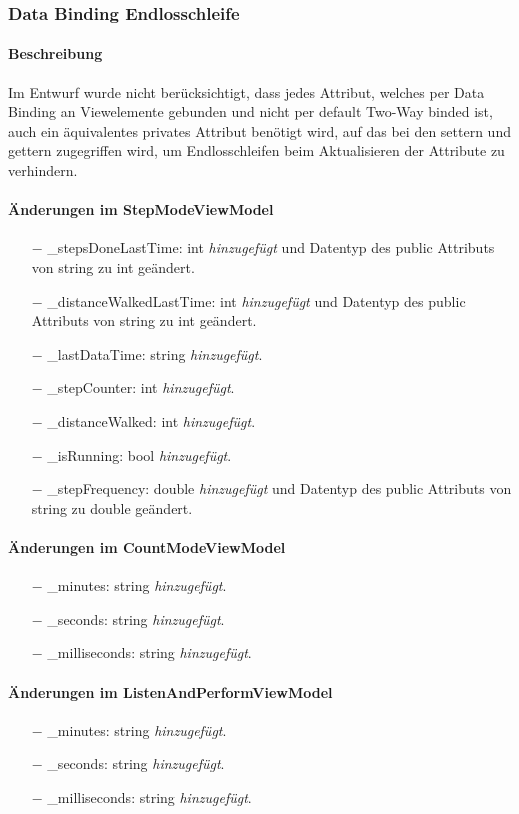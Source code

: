 \documentclass[a4paper,12pt]{article}
\begin{document}
\subsubsection{Data Binding Endlosschleife}
\paragraph{Beschreibung}
Im Entwurf wurde nicht berücksichtigt, dass jedes Attribut, welches per Data Binding an Viewelemente gebunden und nicht per default Two-Way binded ist,  auch ein äquivalentes privates Attribut benötigt wird, auf das bei den settern und gettern zugegriffen wird, um Endlosschleifen beim Aktualisieren der Attribute zu verhindern. 
\paragraph{Änderungen im StepModeViewModel}
\begin{itemize}
	\item[$-$] \_stepsDoneLastTime: int \textit{hinzugefügt} und Datentyp des public Attributs von string zu int geändert.
	\item[$-$] \_distanceWalkedLastTime: int \textit{hinzugefügt} und Datentyp des public Attributs von string zu int geändert.
	\item[$-$] \_lastDataTime: string \textit{hinzugefügt}.
	\item[$-$] \_stepCounter: int \textit{hinzugefügt}.
	\item[$-$] \_distanceWalked: int \textit{hinzugefügt}.
	\item[$-$] \_isRunning: bool \textit{hinzugefügt}.
	\item[$-$] \_stepFrequency: double \textit{hinzugefügt} und Datentyp des public Attributs von string zu double geändert.
\end{itemize}
\paragraph{Änderungen im CountModeViewModel}
\begin{itemize}
	\item[$-$] \_minutes: string \textit{hinzugefügt}. 
	\item[$-$] \_seconds: string \textit{hinzugefügt}.
	\item[$-$] \_milliseconds: string \textit{hinzugefügt}.
\end{itemize}
\paragraph{Änderungen im ListenAndPerformViewModel}
\begin{itemize}
	\item[$-$] \_minutes: string \textit{hinzugefügt}.
	\item[$-$] \_seconds: string \textit{hinzugefügt}.
	\item[$-$] \_milliseconds: string \textit{hinzugefügt}.
\end{itemize}
\end{document}
